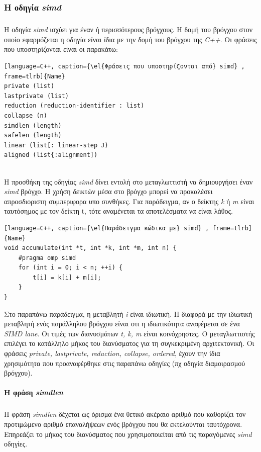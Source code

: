 \documentclass[12pt]{article}
\newcommand{\en}[1]{\foreignlanguage{english}{#1}}
\newcommand{\el}[1]{\selectlanguage{greek}{#1}\selectlanguage{english}}
\begin{document}
\subsubsection{Η οδηγία \emph{\en{simd}}}
\subparagraph{}
Η οδηγία \emph{\en{simd}} ισχύει για έναν ή περισσότερους βρόγχους. Η δομή του βρόγχου στον οποίο εφαρμόζεται η οδηγία είναι ίδια με την δομή του βρόγχου της \emph{\en{C++}}. Οι φράσεις που υποστηρίζονται είναι οι παρακάτω:
\begin{lstlisting}[language=C++, caption={\el{Φράσεις που υποστηρίζονται από} simd} , frame=tlrb]{Name}
private (list)
lastprivate (list)
reduction (reduction-identifier : list)
collapse (n)
simdlen (length)
safelen (length)
linear (list[: linear-step J)
aligned (list{:alignment])
\end{lstlisting}
\ \\
Η προσθήκη της οδηγίας \emph{\en{simd}} δίνει εντολή στο μεταγλωττιστή να δημιουργήσει έναν \emph{\en{simd}} βρόγχο.
Η χρήση δεικτών μέσα στο βρόγχο μπορεί να προκαλέσει απροσδιοριστη συμπεριφορα υπο συνθήκες. Για παράδειγμα, αν ο δείκτης \emph{\en{k}} ή \emph{\en{m}} είναι ταυτόσημος με τον δείκτη t, τότε αναμένεται τα αποτελέσματα να είναι λάθος.
\ \\

\begin{lstlisting}[language=C++, caption={\el{Παράδειγμα κώδικα με} simd} , frame=tlrb]{Name}
void accumulate(int *t, int *k, int *m, int n) {
	#pragma omp simd
	for (int i = 0; i < n; ++i) {
		t[i] = k[i] + m[i];
	}
}
\end{lstlisting}

\clearpage
Στο παραπάνω παράδειγμα, η μεταβλητή \emph{\en{i}} είναι ιδιωτική. Η διαφορά με την ιδιωτική μεταβλητή ενός παράλληλου βρόγχου είναι οτι η ιδιωτικότητα αναφέρεται σε ένα \emph{\en{SIMD lane}}. Oι τιμές των διανυσμάτων \emph{\en{t, k, m}} είναι κοινόχρηστες. Ο μεταγλωττιστής επιλέγει το κατάλληλο μήκος του διανύσματος για τη συγκεκριμένη αρχιτεκτονική. 
Οι φράσεις \emph{\en{private, lastprivate, reduction, collapse, ordered}}, έχουν την ίδια χρησιμότητα που προαναφέρθηκε στις παραπάνω οδηγίες (πχ οδηγία διαμοιρασμού βρόγχου).


\paragraph{H φράση \emph{\en{simdlen}}}
\subparagraph{}
Η φράση \emph{\en{simdlen}} δέχεται ως όρισμα ένα θετικό ακέραιο αριθμό που καθορίζει τον προτιμώμενο αριθμό επαναλήψεων ενός βρόγχου που θα εκτελούνται ταυτόχρονα. Επηρεάζει το μήκος του διανύσματος που χρησιμοποιείται από τις παραγόμενες \emph{\en{simd}} οδηγίες.
\end{document}
